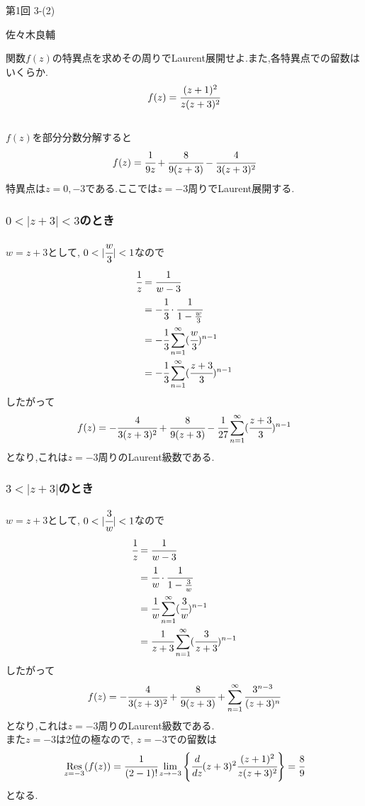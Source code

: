 \documentclass[uplatex,a4j,11pt]{jsarticle}
\begin{document}
第1回 3-(2)
\begin{flushright}
  佐々木良輔
\end{flushright}
関数$f(z)$の特異点を求めその周りでLaurent展開せよ.また,各特異点での留数はいくらか.
\begin{align*}
  f(z)=\cfrac{(z+1)^2}{z(z+3)^2}
\end{align*}
\hrulefill\\
$f(z)$を部分分数分解すると
\begin{align*}
  f(z)=\cfrac{1}{9z}+\cfrac{8}{9(z+3)}-\cfrac{4}{3(z+3)^2}
\end{align*}
特異点は$z=0,-3$である.ここでは$z=-3$周りでLaurent展開する.
\setcounter{subsubsection}{2}
\subsubsection{$0<|z+3|<3$のとき}
$w=z+3$として, $0<|\cfrac{w}{3}|<1$なので
\begin{align*}
  \cfrac{1}{z}&=\cfrac{1}{w-3}\\
  &=-\cfrac{1}{3}\cdot\cfrac{1}{1-\frac{w}{3}}\\
  &=-\cfrac{1}{3}\sum^{\infty}_{n=1}(\cfrac{w}{3})^{n-1}\\
  &=-\cfrac{1}{3}\sum^{\infty}_{n=1}(\cfrac{z+3}{3})^{n-1}
\end{align*}
したがって
\begin{align*}
  f(z)=-\cfrac{4}{3(z+3)^2}+\cfrac{8}{9(z+3)}-\cfrac{1}{27}\sum^{\infty}_{n=1}(\cfrac{z+3}{3})^{n-1}
\end{align*}
となり,これは$z=-3$周りのLaurent級数である.
\subsubsection{$3<|z+3|$のとき}
$w=z+3$として, $0<|\cfrac{3}{w}|<1$なので
\begin{align*}
  \cfrac{1}{z}&=\cfrac{1}{w-3}\\
  &=\cfrac{1}{w}\cdot\cfrac{1}{1-\frac{3}{w}}\\
  &=\cfrac{1}{w}\sum^{\infty}_{n=1}(\cfrac{3}{w})^{n-1}\\
  &=\cfrac{1}{z+3}\sum^{\infty}_{n=1}(\cfrac{3}{z+3})^{n-1}
\end{align*}
したがって
\begin{align*}
  f(z)=-\cfrac{4}{3(z+3)^2}+\cfrac{8}{9(z+3)}+\sum^{\infty}_{n=1}\cfrac{3^{n-3}}{(z+3)^n}
\end{align*}
となり,これは$z=-3$周りのLaurent級数である.\\
また$z=-3$は2位の極なので, $z=-3$での留数は
\begin{align*}
  \underset{z=-3}{\rm{Res}}(f(z))=\cfrac{1}{(2-1)!}\lim_{z\to -3}\left\{\cfrac{d}{dz}(z+3)^2\cfrac{(z+1)^2}{z(z+3)^2}\right\}=\cfrac{8}{9}
\end{align*}
となる.
\end{document}

